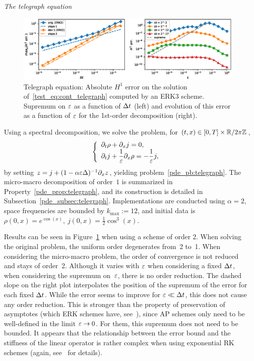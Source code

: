 \renewcommand{\xvar}{\rho}
\renewcommand{\zvar}{z}
\noindent\textit{The telegraph equation}\\
%
\begin{figure}
\centering
\includegraphics[width=\textwidth]{./miMa_Dissipatif/cv_telegraph_erk2.eps}
\vspace*{-24pt}
\caption{Telegraph equation: Absolute $H^1$ error on the solution of~\eqref{test_eq:cont_telegraph} computed by an ERK3 scheme. Supremum on $\varepsilon$ as a function of $\Delta t$ (left) and evolution of this error as a function of $\varepsilon$ for the 1st-order decomposition (right). }
\label{test_fig:telegraph}
\end{figure}%
%
Using a spectral decomposition, we solve the problem, for $(t,x) \in [0,T] \times \mathbb{R}/2\pi\mathbb{Z}$, 
\begin{equation*} 
\left\{ \begin{array}{l}
\dpt \xvar + \dpx j = 0 , \\ \displaystyle
\dpt j + \frac{1}{\eps} \dpx \xvar = -\frac{1}{\eps} j , 
\end{array} \right. 
\end{equation*}
by setting $z = j + (1 - \alpha \varepsilon \Delta)^{-1} \partial_{x} z$, yielding 
problem~\eqref{pde_pb:telegraph}. The micro-macro decomposition of 
order~$1$ is summarized in Property~\ref{pde_prop:telegraph}, and its 
construction is detailed in Subsection~\ref{pde_subsec:telegraph}. 
%
Implementations are conducted using $\alpha = 2$, space frequencies are 
bounded by $k_{\max} := 12$, and initial data is $\xvar(0,x) = 
e^{\cos(x)}, \ j(0,x) = \frac{1}{2} \cos^3 (x)$. 

Results can be seen in Figure~\ref{test_fig:telegraph} when using a scheme
of order 2. When solving the original problem, the uniform order
degenerates from~2 to~1. When considering the micro-macro problem, the
order of convergence is not reduced and stays of order~2. Although it
varies with $\varepsilon$ when considering a fixed $\Delta t$, when considering the
supremum on~$\varepsilon$, there is no order reduction. The dashed slope on the
right plot interpolates the position of the supremum of the error for each
fixed $\Delta t$. While the error seems to improve for $\varepsilon \ll \Delta t$, this does
not cause any order reduction. This is stronger than the property of
preservation of asymptotes (which ERK schemes have,
see~\cite{dimarco.2011.exponential}), since AP schemes only need to be
well-defined in the limit $\varepsilon \rightarrow 0$. For them, this supremum does
not need to be bounded.
%
It appears that the relationship between the error bound and the stiffness
of the linear operator is rather complex when using exponential RK schemes
(again, see~\cite{hochbruck.2005.explicit} for details). 



